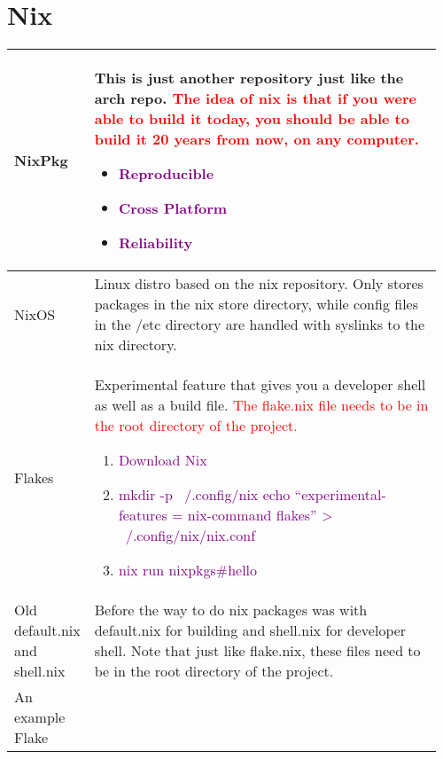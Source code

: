 \documentclass[main.tex,fontsize=8pt,paper=a4,paper=portrait,DIV=calc,]{scrartcl}
\begin{document}
\begin{table}[h!]
\section{Nix}
\begin{tabular}{|m{0.1\linewidth}|m{0.855\linewidth}|}
\hline
NixPkg & 
This is just another repository just like the arch repo.\newline
\textcolor{red}{The idea of nix is that if you were able to build it today, you should be able to build it 20 years from now, on any computer.}\newline
\begin{itemize}
\item \textcolor{purple}{Reproducible}
\item \textcolor{purple}{Cross Platform}
\item \textcolor{purple}{Reliability}
\vspace{-3mm}
\end{itemize} 
\\
\hline
NixOS & 
Linux distro based on the nix repository.\newline
Only stores packages in the nix store directory, while config files in the /etc directory are handled with syslinks to the nix directory.\newline
\\
\hline
Flakes & 
Experimental feature that gives you a developer shell as well as a build file.\newline
\textcolor{red}{The flake.nix file needs to be in the root directory of the project.}\newline
\begin{enumerate}
\item \textcolor{purple}{Download Nix}
\item \textcolor{purple}{mkdir -p ~/.config/nix
echo “experimental-features = nix-command flakes” > ~/.config/nix/nix.conf}
\item \textcolor{purple}{nix run nixpkgs\#hello}
\vspace{-3mm}
\end{enumerate} 
\\
\hline
Old default.nix and shell.nix &
Before the way to do nix packages was with default.nix for building and shell.nix for developer shell.\newline
Note that just like flake.nix, these files need to be in the root directory of  the project.\\
\hline
An example Flake & 
\vspace{2mm}

\end{tabular}
\end{table}
\end{document}
